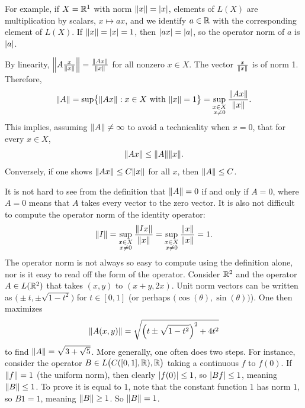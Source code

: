 For example, if $X={\mathbb{R}}^1$ with norm $\lVert {x} \rVert=\lvert {x} \rvert$, elements of $L(X)$
are multiplication by scalars, $x \mapsto ax$, and we identify $a \in {\mathbb{R}}$ with the
corresponding element of $L(X)$.  If $\lVert {x} \rVert=\lvert {x} \rvert=1$, then $\lvert {a x} \rvert = \lvert {a} \rvert$, so
the operator norm of $a$ is $\lvert {a} \rvert$.

By linearity,
$\left\lVert {A \frac{x}{\lVert {x} \rVert}} \right\rVert = \frac{\lVert {Ax} \rVert}{\lVert {x} \rVert}$
for all nonzero $x \in X$.
The vector $\frac{x}{\lVert {x} \rVert}$ is of norm 1.
Therefore,
\begin{equation*}
\lVert {A} \rVert =
\sup \bigl\{ \lVert {Ax} \rVert : x \in X \text{ with } \lVert {x} \rVert = 1 \bigr\}
=
\sup_{\substack{x \in X\\x\neq 0}} \frac{\lVert {Ax} \rVert}{\lVert {x} \rVert} .
\end{equation*}
This implies, assuming $\lVert {A} \rVert\not= \infty$ to avoid a technicality when $x=0$,
that for every $x \in X$,
\begin{equation*}
\snorm{Ax} \leq \snorm{A}  \snorm{x} .
\avoidbreak
\end{equation*}
Conversely, if one shows $\lVert {Ax} \rVert \leq C \lVert {x} \rVert$ for all $x$,
then $\lVert {A} \rVert \leq C$.

It is not hard to see from the definition that $\lVert {A} \rVert = 0$ if and
only if $A = 0$, where $A=0$ means that $A$ takes every vector to the zero vector.
It is also not difficult to compute the operator norm of the identity operator:
\begin{equation*}
\lVert {I} \rVert =
\sup_{\substack{x \in X\\x\neq 0}} \frac{\lVert {Ix} \rVert}{\lVert {x} \rVert} 
=
\sup_{\substack{x \in X\\x\neq 0}} \frac{\lVert {x} \rVert}{\lVert {x} \rVert} 
= 1.
\end{equation*}
The operator norm is not always so easy to compute using the definition
alone, nor is it easy to read off the form of the operator.
Consider ${\mathbb{R}}^2$ and the operator $A \in L({\mathbb{R}}^2)$ that takes
$(x,y)$ to $(x+y,2x)$.  
Unit norm vectors can be written as
$\bigl(\pm t, \pm \sqrt{1-t^2}\bigr)$
for $t \in [0,1]$
(or perhaps $\bigl(\cos(\theta), \sin(\theta) \bigr)$).
One then maximizes
\begin{equation*}
\lVert {A(x,y)} \rVert = \sqrt{{\left(t \pm \sqrt{1-t^2}\right)}^2+4t^2}
\end{equation*}
to find $\lVert {A} \rVert = \sqrt{3+\sqrt{5}}$.
More generally, one often does two steps.  For instance, consider
the operator
$B \in L\bigl(C([0,1],{\mathbb{R}}),{\mathbb{R}}\bigr)$
taking a continuous $f$ to $f(0)$.  If $\lVert {f} \rVert = 1$ (the uniform norm),
then clearly $\lvert {f(0)} \rvert \leq 1$, so $\lvert {Bf} \rvert \leq 1$, meaning
$\lVert {B} \rVert \leq 1$.
To prove it is equal to $1$, note that the constant function $1$ has
norm $1$, so $B1 = 1$, meaning $\lVert {B} \rVert \geq 1$.
So $\lVert {B} \rVert=1$.


